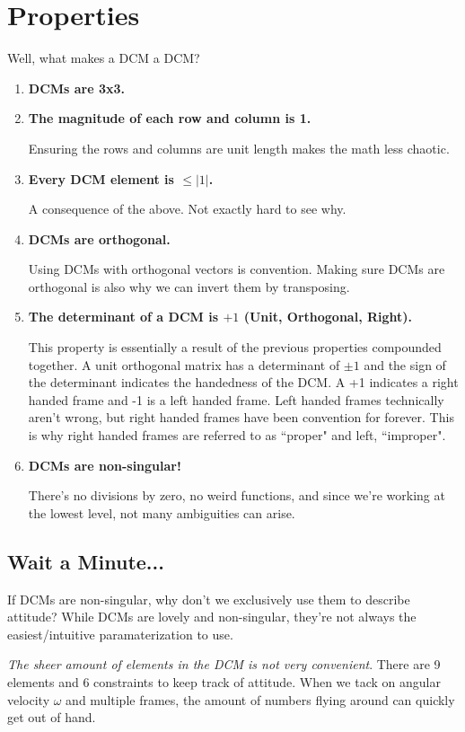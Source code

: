 \documentclass[a4paper,14pt]{extreport}
\begin{document}
\section{Properties}
Well, what makes a DCM a DCM?
\begin{enumerate}
\item{\textbf{DCMs are 3x3.}}

\item{\textbf{The magnitude of each row and column is 1.}}

Ensuring the rows and columns are unit length makes the math less chaotic.

\item{\textbf{Every DCM element is $\leq |1|$.}}

A consequence of the above. Not exactly hard to see why.

\item{\textbf{DCMs are orthogonal.}}

Using DCMs with orthogonal vectors is convention. Making sure DCMs are orthogonal is also why we can invert them by transposing.

\item{\textbf{The determinant of a DCM is $+1$ (Unit, Orthogonal, Right).}}

This property is essentially a result of the previous properties compounded together. A unit orthogonal matrix has a determinant of $\pm 1$ and the sign of the determinant indicates the handedness of the DCM. A +1 indicates a right handed frame and -1 is a left handed frame. Left handed frames technically aren't wrong, but right handed frames have been convention for forever. This is why right handed frames are referred to as ``proper" and left, ``improper".

\item{\textbf{DCMs are non-singular!}}

There's no divisions by zero, no weird functions, and since we're working at the lowest level, not many ambiguities can arise.
\end{enumerate}

\subsection{Wait a Minute...}
If DCMs are non-singular, why don't we exclusively use them to describe attitude? While DCMs are lovely and non-singular, they're not always the easiest/intuitive paramaterization to use. 


\emph{The sheer amount of elements in the DCM is not very convenient}. There are 9 elements and 6 constraints to keep track of attitude. When we tack on angular velocity $\omega$ and multiple frames, the amount of numbers flying around can quickly get out of hand.
\end{document}
